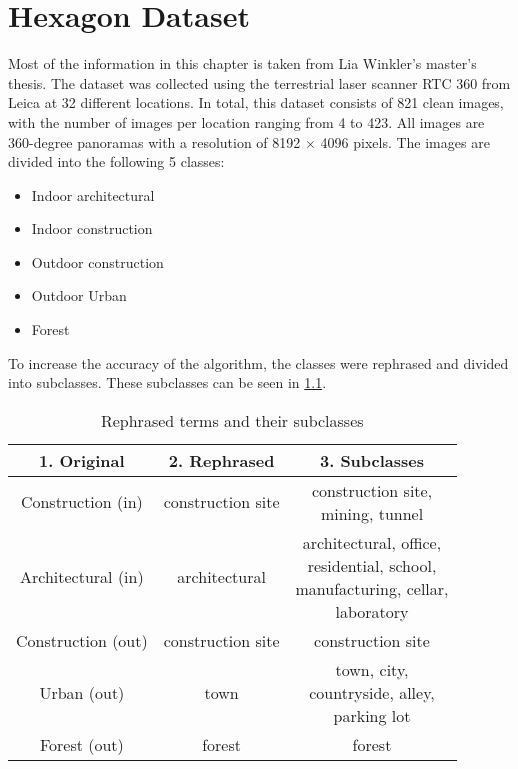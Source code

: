 \chapter{Hexagon Dataset
    \label{chapter:dataset}}
Most of the information in this chapter is taken from Lia Winkler's master's thesis.  
The dataset was collected using the terrestrial laser scanner RTC 360 from Leica at 32 different locations.  
In total, this dataset consists of 821 clean images, with the number of images per location ranging from 4 to 423.  
All images are 360-degree panoramas with a resolution of 8192 \(\times\) 4096 pixels.  
The images are divided into the following 5 classes:

\begin{itemize}
    \item Indoor architectural
    \item Indoor construction
    \item Outdoor construction
    \item Outdoor Urban
    \item Forest
\end{itemize}

\noindent
To increase the accuracy of the algorithm, the classes were rephrased and divided into subclasses.  
These subclasses can be seen in \cref{tab:dataset:subclasses}.

\begin{table}[]
    \centering
    \begin{tabular}{ccc}
    \toprule
    \textbf{1. Original}& \textbf{2. Rephrased}& \textbf{3. Subclasses}\\ \midrule
    Construction (in) & construction site & \makecell{construction site,\\ mining, tunnel}\\ \hline
    Architectural (in)& architectural& \makecell{architectural, office,\\ residential, school,\\ manufacturing, cellar,\\ laboratory} \\ \hline
    Construction (out)& construction site & construction site \\ \hline
    Urban (out)& town & \makecell{town, city,\\countryside, alley,\\ parking lot} \\ \hline
    Forest (out)& forest& forest \\
    \bottomrule
    \end{tabular}
    \caption{Rephrased terms and their subclasses
        \label{tab:dataset:subclasses}}
\end{table}

